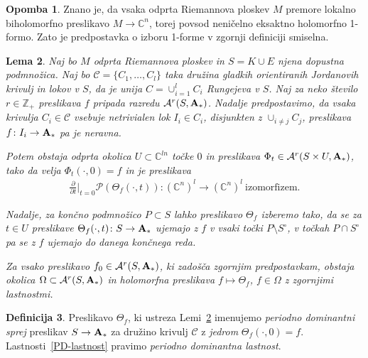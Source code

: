 \documentclass[12pt,a4paper,twoside]{article}
\theoremstyle{definition} %
\newtheorem{definicija}{Definicija}[section]
\newtheorem{opomba}[definicija]{Opomba}
\theoremstyle{plain} %
\newtheorem{lema}[definicija]{Lema}
\numberwithin{equation}{section}  %
\newcommand{\Z}{\mathbb Z}
\newcommand{\C}{\mathbb C}
\begin{document}
\begin{opomba}
Znano je, da vsaka odprta Riemannova ploskev $M$ premore lokalno biholomorfno preslikavo $M \to \C^{n}$, torej povsod neničelno eksaktno holomorfno 1-formo. Zato je predpostavka o izboru 1-forme v zgornji definiciji smiselna.
\end{opomba}

\begin{lema} \label{lema:P-D-sprej}
Naj bo $M$ odprta Riemannova ploskev in $S = K \cup E$ njena dopustna podmnožica. Naj bo $\mathcal{C} = \{C_1, \dots , C_{l} \}$ taka družina gladkih orientiranih Jordanovih krivulj in lokov v $S$, da je unija $C = \cup_{i=1}^{l} C_{i}$ Rungejeva v $S$.
Naj za neko število $r \in \Z_{+}$ preslikava $f$ pripada razredu $\mathcal{A}^{r}(S, \textbf{\textup{A}}_{*})$.
Nadalje predpostavimo, da vsaka krivulja $C_{i} \in \mathcal{C}$ vsebuje netrivialen lok $I_{i} \in C_{i}$, disjunkten z $\cup_{i \neq j}C_{j}$, preslikava $f \colon I_{i} \to \textbf{\textup{A}}_{*}$ pa je neravna.

Potem obstaja odprta okolica $U \subset \C^{ln}$ točke $0$ in preslikava $\Phi_{t} \in \mathcal{A}^{r} (S \times U, \textbf{\textup{A}}_{*})$, tako da velja
$\Phi_{t}(\cdot, 0) = f$ in je preslikava
\begin{align} \label{PD-lastnost}
	 \frac{\partial}{\partial t} \Big|_{t=0} \mathcal{P}(\Theta_{f}(\cdot, t)) \colon (\C^{n})^{l} \to (\C^{n})^{l} \ \text{izomorfizem.}
\end{align}

Nadalje, za končno podmnožico $P \subset S$ lahko preslikavo $\Theta_{f}$ izberemo tako, da se za $t \in U$ preslikave $\Theta_{f}(\cdot, t) \colon S \to\textbf{\textup{A}}_{*}$ ujemajo z $f$ v vsaki točki $P \setminus S^\circ$, v točkah $P \cap S^\circ$ pa se z $f$ ujemajo do danega končnega reda.

Za vsako preslikavo $f_{0} \in \mathcal{A}^{r}(S, \textbf{\textup{A}}_{*})$, ki zadošča zgornjim predpostavkam, obstaja okolica $\Omega \subset \mathcal{A}^{r}(S, \textbf{\textup{A}}_{*})$ in holomorfna preslikava $f \mapsto \Theta_{f}$, $f \in \Omega$ z zgornjimi lastnostmi.
\end{lema}

\begin{definicija}
Preslikavo $\Theta_{f}$, ki ustreza Lemi~\ref{lema:P-D-sprej} imenujemo \emph{periodno dominantni sprej} preslikav $S \to \textbf{\textup{A}}_{*}$ za družino krivulj $\mathcal{C}$ z \emph{jedrom} $\Theta_{f}(\cdot, 0) = f$. Lastnosti~\ref{PD-lastnost} pravimo \emph{periodno dominantna lastnost}.
\end{definicija}
\end{document}
